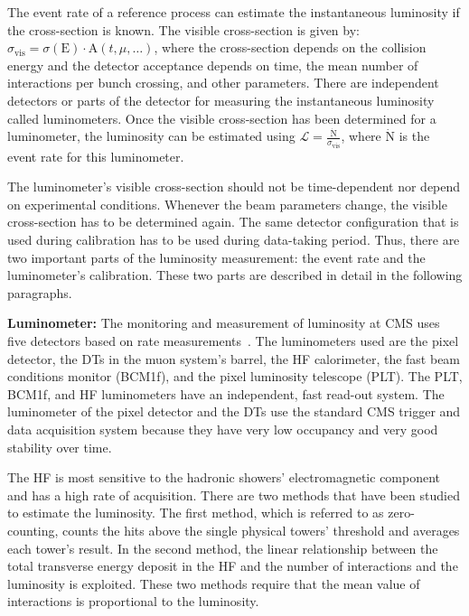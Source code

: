 The event rate of a reference process can estimate the instantaneous luminosity if the cross-section is known. The visible cross-section is given by: $\sigma_{\text{vis}}=\sigma(\text{E})\cdot\text{A}(t,\mu,\ldots)$, where the cross-section depends on the collision energy and the detector acceptance depends on time, the mean number of interactions per bunch crossing, and other parameters. There are independent detectors or parts of the detector for measuring the instantaneous luminosity called luminometers. Once the visible cross-section has been determined for a luminometer, the luminosity can be estimated using $\mathcal{L}=\frac{\dot{\text{N}}}{\sigma_{\text{vis}}}$, where $\dot{\text{N}}$ is the event rate for this luminometer.

The luminometer's visible cross-section should not be time-dependent nor depend on experimental conditions. Whenever the beam parameters change, the visible cross-section has to be determined again. The same detector configuration that is used during calibration has to be used during data-taking period. Thus, there are two important parts of the luminosity measurement: the event rate and the luminometer's calibration. These two parts are described in detail in the following paragraphs.

\textbf{Luminometer:} The monitoring and measurement of luminosity at CMS uses five detectors based on rate measurements~\cite{CMS:2019jhq, CMS:2018elu, CMS:2017sdi}. The luminometers used are the pixel detector, the DTs in the muon system's barrel, the HF calorimeter, the fast beam conditions monitor (BCM1f), and the pixel luminosity telescope (PLT). The PLT, BCM1f, and HF luminometers have an independent, fast read-out system. The luminometer of the pixel detector and the DTs use the standard CMS trigger and data acquisition system because they have very low occupancy and very good stability over time.

The HF is most sensitive to the hadronic showers' electromagnetic component and has a high rate of acquisition. There are two methods that have been studied to estimate the luminosity. The first method, which is referred to as zero-counting, counts the hits above the single physical towers' threshold and averages each tower's result. In the second method, the linear relationship between the total transverse energy deposit in the HF and the number of interactions and the luminosity is exploited. These two methods require that the mean value of interactions is proportional to the luminosity.

